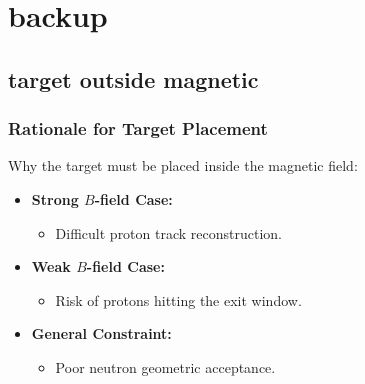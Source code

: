 \documentclass[aspectratio=169]{beamer}
\begin{document}
\section{backup}


\subsection{target outside magnetic}

\begin{frame}
    \frametitle{Rationale for Target Placement}
    
    Why the target must be placed inside the magnetic field:
    
    \vspace{0.5cm}
    
    \begin{itemize}
        \item \textbf{Strong $B$-field Case:} 
        \begin{itemize}
            \item Difficult proton track reconstruction.
        \end{itemize}
        
        \item \textbf{Weak $B$-field Case:} 
        \begin{itemize}
            \item Risk of protons hitting the exit window.
        \end{itemize}
        
        \item \textbf{General Constraint:} 
        \begin{itemize}
            \item Poor neutron geometric acceptance.
        \end{itemize}
    \end{itemize}
\end{frame}


\end{document}
